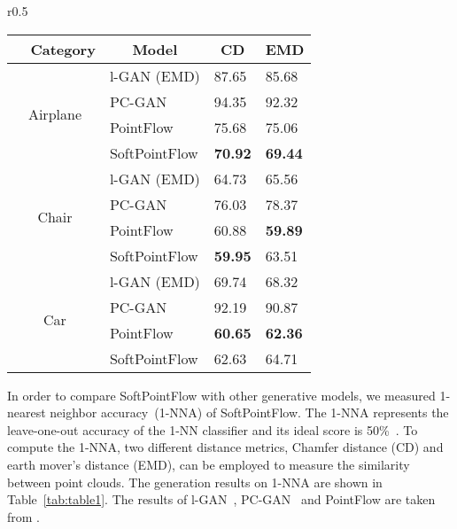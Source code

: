 \documentclass{article}
\begin{document}
\begin{wraptable}{r}{0.5\linewidth}
\vspace{-15pt}
\caption{Generation results on 1-NNA~(\%). Lower is better.}
\vspace{7pt}
\label{tab:table1}
\centering
\begin{tabular}{@{}clll@{}}
\toprule
~~Category                  & \multicolumn{1}{c}{Model} & \multicolumn{1}{c}{CD} & \multicolumn{1}{c}{EMD} \\ \midrule
\multirow{4}{*}{Airplane} & l-GAN (EMD)               & 87.65                  & 85.68                   \\
                          & PC-GAN                    & 94.35                  & 92.32                   \\
                          & PointFlow                 & 75.68                  & 75.06                   \\
                          & SoftPointFlow             & \textbf{70.92}         & \textbf{69.44}          \\ \midrule
\multirow{4}{*}{Chair}    & l-GAN (EMD)               & 64.73                  & 65.56                   \\
                          & PC-GAN                    & 76.03                  & 78.37                   \\
                          & PointFlow                 & 60.88                  & \textbf{59.89}          \\
                          & SoftPointFlow             & \textbf{59.95}         & 63.51                   \\ \midrule
\multirow{4}{*}{Car}      & l-GAN (EMD)               & 69.74                  & 68.32                   \\
                          & PC-GAN                    & 92.19                  & 90.87                   \\
                          & PointFlow                 & \textbf{60.65}         & \textbf{62.36}          \\
                          & SoftPointFlow             & 62.63                  & 64.71                   \\ \bottomrule
\end{tabular}
\end{wraptable}
In order to compare SoftPointFlow with other generative models, we measured 1-nearest neighbor accuracy~(1-NNA) of SoftPointFlow. The 1-NNA represents the leave-one-out accuracy of the 1-NN classifier and its ideal score is 50\%~\citep{lopez2016revisiting}. To compute the 1-NNA, two different distance metrics, Chamfer distance (CD) and earth mover’s distance (EMD), can be employed to measure the similarity between point clouds. The generation results on 1-NNA are shown in Table~\ref{tab:table1}. The results of l-GAN~\citep{achlioptas2017learning}, PC-GAN~\citep{li2018point} and PointFlow are taken from \citet{yang2019pointflow}. 
\end{document}
